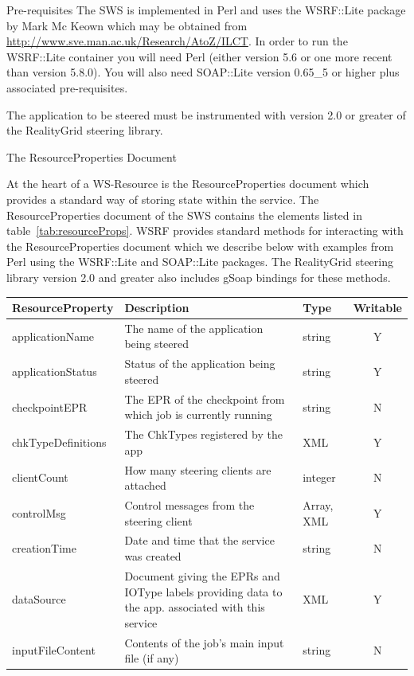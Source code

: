 \documentclass[a4paper]{article}
\begin{document}
\begin{section}{Pre-requisites}
The SWS is implemented in Perl and uses the WSRF::Lite package by Mark
Mc Keown which may be obtained from
\url{http://www.sve.man.ac.uk/Research/AtoZ/ILCT}.  In order to run
the WSRF::Lite container you will need Perl (either version 5.6 or
one more recent than version 5.8.0).  You will also need SOAP::Lite version
0.65\_5 or higher plus associated pre-requisites.

The application to be steered must be instrumented with version 2.0 or
greater of the RealityGrid steering library.
\end{section}


\begin{section}{The ResourceProperties Document}
\label{sec:RPDoc}

At the heart of a WS-Resource is the ResourceProperties document which
provides a standard way of storing state within the service.  The
ResourceProperties document of the SWS contains the elements listed in
table~\ref{tab:resourceProps}.  WSRF provides standard methods for
interacting with the ResourceProperties document which we describe
below with examples from Perl using the WSRF::Lite and SOAP::Lite
packages.  The RealityGrid steering library version 2.0 and greater
also includes gSoap bindings for these methods.

\begin{table}
\begin{center}
\begin{tabular}{l|p{6cm}|l|c}
\hline\hline
ResourceProperty   & Description & Type & Writable\\
\hline
applicationName    & The name of the application being steered & string & Y\\
applicationStatus  & Status of the application being steered & string & Y\\
checkpointEPR      & The EPR of the checkpoint from which job is currently running & string & N\\
chkTypeDefinitions & The ChkTypes registered by the app & XML & Y\\
clientCount        & How many steering clients are attached & integer & N\\
controlMsg         & Control messages from the steering client & Array, XML & Y\\
creationTime       & Date and time that the service was created & string & N\\
dataSource         & Document giving the EPRs and IOType labels providing data to the app. associated with this service & XML & Y\\ 
inputFileContent   & Contents of the job's main input file (if any) & string & N\\


\end{tabular}
\end{center}
\end{table}
\end{section}
\end{document}
